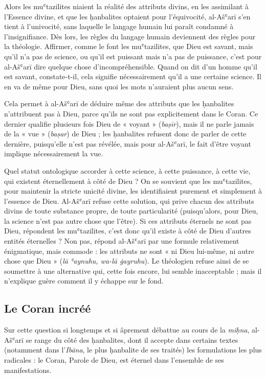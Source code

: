 Alors les muʿtazilites niaient la réalité des attributs divins, en les
assimilant à l'Essence divine, et que les ḥanbalites optaient pour
l'équivocité, al-Ašʿarī s'en tient à l'univocité, sans laquelle le
langage humain lui paraît condamné à l'insignifiance. Dès lors, les
règles du langage humain deviennent des règles pour la théologie.
Affirmer, comme le font les muʿtazilites, que Dieu est savant, mais
qu'il n'a pas de science, ou qu'il est puissant mais n'a pas de
puissance, c'est pour al-Ašʿarī dire quelque chose d'incompréhensible.
Quand on dit
d'un homme qu'il est savant, constate-t-il, cela signifie nécessairement
qu'il a une certaine science. Il en va de même pour Dieu, sans quoi les
mots n'auraient plus aucun sens.

Cela permet à al-Ašʿarī de déduire même des attributs que les ḥanbalites
n'attribuent pas à Dieu, parce qu'ils ne sont pas explicitement dans le
Coran. Ce dernier qualifie plusieurs fois Dieu de « voyant »
(\emph{baṣīr}), mais il ne parle jamais de la « vue » (\emph{baṣar}) de
Dieu ; les ḥanbalites refusent donc de parler de cette dernière,
puisqu'elle n'est pas révélée, mais pour al-Ašʿarī, le fait d'être
voyant implique nécessairement la vue.

Quel statut ontologique accorder à cette science, à cette puissance, à
cette vie, qui existent éternellement à côté de Dieu ? On se souvient
que les muʿtazilites, pour maintenir la stricte unicité divine, les
identifiaient purement et simplement à l'essence de Dieu. Al-Ašʿarī
refuse cette solution, qui prive chacun des attributs divins de toute
substance propre, de toute particularité (puisqu'alors, pour Dieu, la
science n'est pas autre chose que l'être). Si ces attributs éternels ne
sont pas Dieu, répondent les muʿtazilites, c'est donc qu'il existe à
côté de Dieu d'autres entités éternelles ? Non pas, répond al-Ašʿarī par
une formule relativement énigmatique, mais commode : les attributs ne
sont « ni Dieu lui-même, ni autre chose que Dieu » (\emph{lā ʿaynuhu,
wa-lā ġayruhu}). Le théologien refuse ainsi de se soumettre à une
alternative qui, cette fois encore, lui semble inacceptable ; mais il
n'explique guère comment il y échappe sur le fond.


  \subsection{Le Coran incréé}


Sur cette question si longtemps et si âprement débattue au cours de la
\emph{miḥna}, al-Ašʿarī se range du côté des ḥanbalites, dont il accepte
dans certains textes (notamment dans l'\emph{Ibāna}, le plus ḥanbalite
de ses traités) les formulations les plus radicales : le Coran, Parole
de Dieu, est éternel dans l'ensemble de ses manifestations.

